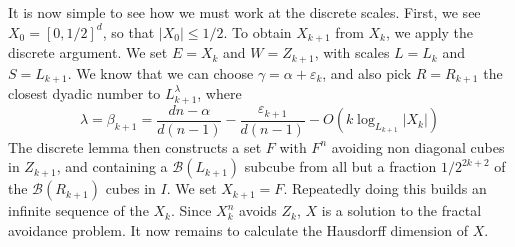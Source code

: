 \documentclass{article}
\theoremstyle{plain}
\theoremstyle{plain}
\begin{document}
It is now simple to see how we must work at the discrete scales. First, we see $X_0 = [0,1/2]^d$, so that $|X_0| \leq 1/2$. To obtain $X_{k+1}$ from $X_k$, we apply the discrete argument. We set $E = X_k$ and $W = Z_{k+1}$, with scales $L = L_k$ and $S = L_{k+1}$. We know that we can choose $\gamma = \alpha + \varepsilon_k$, and also pick $R = R_{k+1}$ the closest dyadic number to $L_{k+1}^\lambda$, where
%
\[ \lambda = \beta_{k+1} = \frac{dn - \alpha}{d(n-1)} - \frac{\varepsilon_{k+1}}{d(n-1)} - O(k \log_{L_{k+1}} |X_k|) \]
%
The discrete lemma then constructs a set $F$ with $F^n$ avoiding non diagonal cubes in $Z_{k+1}$, and containing a $\mathcal{B}(L_{k+1})$ subcube from all but a fraction $1/2^{2k +2}$ of the $\mathcal{B}(R_{k+1})$ cubes in $I$. We set $X_{k+1} = F$. Repeatedly doing this builds an infinite sequence of the $X_k$. Since $X_k^n$ avoids $Z_k$, $X$ is a solution to the fractal avoidance problem. It now remains to calculate the Hausdorff dimension of $X$.




%
%
\end{document}
